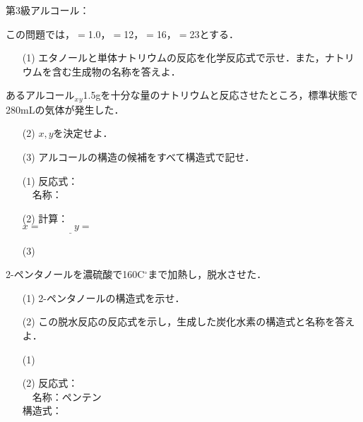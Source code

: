 \documentclass[a4paper,12pt]{ltjsreport}
\begin{document}
    \noindent 第3級アルコール：\newpage
    \begin{que}
        この問題では，$=$1.0，$=$12，$=$16，$=$23とする．
    \begin{itemize}
        \item [(1)]エタノールと単体ナトリウムの反応を化学反応式で示せ．また，ナトリウムを含む生成物の名称を答えよ．
    \end{itemize}
            あるアルコール$_{x}$$_{y}$1.5gを十分な量のナトリウムと反応させたところ，標準状態で280mLの気体が発生した．
            \begin{itemize}
                \item [(2)]$x,y$を決定せよ．
                \item [(3)]アルコールの構造の候補をすべて構造式で記せ．
            \end{itemize}
    \end{que}
    \ans
    \begin{itemize}
        \item [(1)]反応式：\\[15pt]
        　名称：\\[10pt]
        \item[(2)]計算：\\[70pt]$　　　　　　　　　　　　　　　　　　　　　　　　\underline{x=~~~~~~~~~~~~~~~y=~~~~~~~~~~~~}$\\[10pt]
        \item[(3)] 
    \end{itemize}
    \newpage
    \begin{que}
      2-ペンタノールを濃硫酸で160C$^\circ$まで加熱し，脱水させた．
      \begin{itemize}
        \item [(1)]2-ペンタノールの構造式を示せ．
        \item [(2)]この脱水反応の反応式を示し，生成した炭化水素の構造式と名称を答えよ．
      \end{itemize}
    \end{que}
    \ans
    \begin{itemize}
        \item [(1)]　\\[70pt]
        \item [(2)]反応式：\\[30pt]
        　名称：ペンテン\\[30pt]
        構造式：
    \end{itemize}
\end{document}
